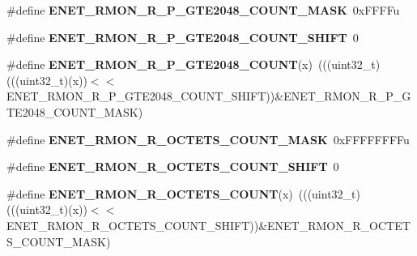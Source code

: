 \begin{DoxyCompactItemize}
\item 
\#define {\bfseries E\+N\+E\+T\+\_\+\+R\+M\+O\+N\+\_\+\+R\+\_\+\+P\+\_\+\+G\+T\+E2048\+\_\+\+C\+O\+U\+N\+T\+\_\+\+M\+A\+SK}~0x\+F\+F\+F\+Fu\hypertarget{group__ENET__Register__Masks_gaf5df4a669f61146ee44ed2f49360b952}{}\label{group__ENET__Register__Masks_gaf5df4a669f61146ee44ed2f49360b952}

\item 
\#define {\bfseries E\+N\+E\+T\+\_\+\+R\+M\+O\+N\+\_\+\+R\+\_\+\+P\+\_\+\+G\+T\+E2048\+\_\+\+C\+O\+U\+N\+T\+\_\+\+S\+H\+I\+FT}~0\hypertarget{group__ENET__Register__Masks_ga904cd13cbfecbb28ad3eb52c05fd3df0}{}\label{group__ENET__Register__Masks_ga904cd13cbfecbb28ad3eb52c05fd3df0}

\item 
\#define {\bfseries E\+N\+E\+T\+\_\+\+R\+M\+O\+N\+\_\+\+R\+\_\+\+P\+\_\+\+G\+T\+E2048\+\_\+\+C\+O\+U\+NT}(x)~(((uint32\+\_\+t)(((uint32\+\_\+t)(x))$<$$<$E\+N\+E\+T\+\_\+\+R\+M\+O\+N\+\_\+\+R\+\_\+\+P\+\_\+\+G\+T\+E2048\+\_\+\+C\+O\+U\+N\+T\+\_\+\+S\+H\+I\+FT))\&E\+N\+E\+T\+\_\+\+R\+M\+O\+N\+\_\+\+R\+\_\+\+P\+\_\+\+G\+T\+E2048\+\_\+\+C\+O\+U\+N\+T\+\_\+\+M\+A\+SK)\hypertarget{group__ENET__Register__Masks_gaa844aadcdf419a7c56585c6b46e08652}{}\label{group__ENET__Register__Masks_gaa844aadcdf419a7c56585c6b46e08652}

\item 
\#define {\bfseries E\+N\+E\+T\+\_\+\+R\+M\+O\+N\+\_\+\+R\+\_\+\+O\+C\+T\+E\+T\+S\+\_\+\+C\+O\+U\+N\+T\+\_\+\+M\+A\+SK}~0x\+F\+F\+F\+F\+F\+F\+F\+Fu\hypertarget{group__ENET__Register__Masks_ga31948c93e2594b779db5084f7c65a294}{}\label{group__ENET__Register__Masks_ga31948c93e2594b779db5084f7c65a294}

\item 
\#define {\bfseries E\+N\+E\+T\+\_\+\+R\+M\+O\+N\+\_\+\+R\+\_\+\+O\+C\+T\+E\+T\+S\+\_\+\+C\+O\+U\+N\+T\+\_\+\+S\+H\+I\+FT}~0\hypertarget{group__ENET__Register__Masks_ga048e6dcb8662f710b44101a65f6bc6c8}{}\label{group__ENET__Register__Masks_ga048e6dcb8662f710b44101a65f6bc6c8}

\item 
\#define {\bfseries E\+N\+E\+T\+\_\+\+R\+M\+O\+N\+\_\+\+R\+\_\+\+O\+C\+T\+E\+T\+S\+\_\+\+C\+O\+U\+NT}(x)~(((uint32\+\_\+t)(((uint32\+\_\+t)(x))$<$$<$E\+N\+E\+T\+\_\+\+R\+M\+O\+N\+\_\+\+R\+\_\+\+O\+C\+T\+E\+T\+S\+\_\+\+C\+O\+U\+N\+T\+\_\+\+S\+H\+I\+FT))\&E\+N\+E\+T\+\_\+\+R\+M\+O\+N\+\_\+\+R\+\_\+\+O\+C\+T\+E\+T\+S\+\_\+\+C\+O\+U\+N\+T\+\_\+\+M\+A\+SK)\hypertarget{group__ENET__Register__Masks_ga9c8d0f6539dace79465f4e616914072c}{}\label{group__ENET__Register__Masks_ga9c8d0f6539dace79465f4e616914072c}


\end{DoxyCompactItemize}
